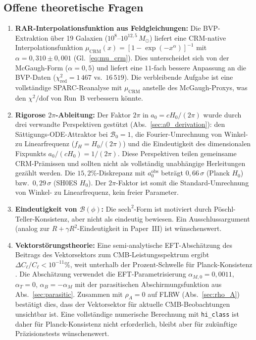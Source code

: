 \documentclass[aps,prd,twocolumn,superscriptaddress,nofootinbib]{revtex4-2}
\begin{document}
\subsection{Offene theoretische Fragen}

\begin{enumerate}
\item \textbf{RAR-Interpolationsfunktion aus Feldgleichungen:} Die BVP-Extraktion \"uber 19 Galaxien ($10^8$--$10^{12{,}5}\,M_\odot$) liefert eine CRM-native Interpolationsfunktion $\mu_{\mathrm{CRM}}(x) = [1 - \exp(-x^\alpha)]^{-1}$ mit $\alpha = 0{,}310 \pm 0{,}001$ (Gl.~\ref{eq:mu_crm}). Dies unterscheidet sich von der McGaugh-Form ($\alpha = 0{,}5$) und liefert eine $11$-fach bessere Anpassung an die BVP-Daten ($\chi^2_{\mathrm{red}} = 1\,467$ vs.\ $16\,519$). Die verbleibende Aufgabe ist eine vollst\"andige SPARC-Reanalyse mit $\mu_{\mathrm{CRM}}$ anstelle des McGaugh-Proxys, was den $\chi^2/\mathrm{dof}$ von Run~B verbessern k\"onnte.

\item \textbf{Rigorose $2\pi$-Ableitung:} Der Faktor $2\pi$ in $a_0 = cH_0/(2\pi)$ wurde durch drei verwandte Perspektiven gest\"utzt (Abs.~\ref{sec:a0_derivation}): den S\"attigungs-ODE-Attraktor bei $\mathcal{B}_0 = 1$, die Fourier-Umrechnung von Winkel- zu Linearfrequenz ($f_H = H_0/(2\pi)$) und die Eindeutigkeit des dimensionalen Fixpunkts $a_0/(cH_0) = 1/(2\pi)$. Diese Perspektiven teilen gemeinsame CRM-Pr\"amissen und sollten nicht als vollst\"andig unabh\"angige Herleitungen gez\"ahlt werden. Die $15{,}2\%$-Diskrepanz mit $a_0^{\mathrm{obs}}$ betr\"agt $0{,}66\,\sigma$ (Planck $H_0$) bzw.\ $0{,}29\,\sigma$ (SH0ES $H_0$). Der $2\pi$-Faktor ist somit die Standard-Umrechnung von Winkel- zu Linearfrequenz, kein freier Parameter.

\item \textbf{Eindeutigkeit von $\mathcal{B}(\phi)$:} Die $\mathrm{sech}^2$-Form ist motiviert durch P\"oschl-Teller-Konsistenz, aber nicht als eindeutig bewiesen. Ein Ausschlussargument (analog zur $R + \gamma R^2$-Eindeutigkeit in Paper~III) ist w\"unschenswert.

\item \textbf{Vektorst\"orungstheorie:} Eine semi-analytische EFT-Absch\"atzung des Beitrags des Vektorsektors zum CMB-Leistungsspektrum ergibt $\Delta C_\ell / C_\ell < 10^{-11}\%$, weit unterhalb der Prozent-Schwelle f\"ur Planck-Konsistenz \cite{PlanckMG2016}. Die Absch\"atzung verwendet die EFT-Parametrisierung $\alpha_{M,0} = 0{,}0011$, $\alpha_T = 0$, $\alpha_B = -\alpha_M$ mit der parasitischen Abschirmungsfunktion aus Abs.~\ref{sec:parasitic}. Zusammen mit $\rho_A = 0$ auf FLRW (Abs.~\ref{sec:rho_A}) best\"atigt dies, dass der Vektorsektor f\"ur aktuelle CMB-Beobachtungen unsichtbar ist. Eine vollst\"andige numerische Berechnung mit \texttt{hi\_class} ist daher f\"ur Planck-Konsistenz nicht erforderlich, bleibt aber f\"ur zuk\"unftige Pr\"azisionstests w\"unschenswert.


\end{enumerate}
\end{document}
